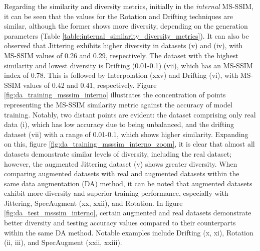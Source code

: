 \documentclass[journal]{IEEEtran}
\begin{document}
Regarding the similarity and diversity metrics, initially in the \textit{internal} MS-SSIM, it can be seen that the values for the Rotation and Drifting techniques are similar, although the former shows more diversity, depending on the generation parameters (Table \ref{table:internal_similarity_diversity_metrics}).
It can also be observed that Jittering exhibits higher diversity in datasets (v) and (iv), with MS-SSIM values of 0.26 and 0.29, respectively.
The dataset with the highest similarity and lowest diversity is Drifting (0.01-0.1) (vii), which has an MS-SSIM index of 0.78. This is followed by Interpolation (xxv) and Drifting (vi), with MS-SSIM values of 0.42 and 0.41, respectively.
Figure \ref{fig:da_training_msssim_interno} illustrates the concentration of points representing the MS-SSIM similarity metric against the accuracy of model training. Notably, two distant points are evident: the dataset comprising only real data (i), which has low accuracy due to being unbalanced, and the drifting dataset (vii) with a range of 0.01-0.1, which shows higher similarity. Expanding on this, figure \ref{fig:da_training_msssim_interno_zoom}, it is clear that almost all datasets demonstrate similar levels of diversity, including the real dataset; however, the augmented Jittering dataset (v) shows greater diversity.
When comparing augmented datasets with real and augmented datasets within the same data augmentation (DA) method, it can be noted that augmented datasets exhibit more diversity and superior training performance, especially with Jittering, SpecAugment (xx, xxii), and Rotation.
In figure \ref{fig:da_test_msssim_interno}, certain augmented and real datasets demonstrate better diversity and testing accuracy values compared to their counterparts within the same DA method. Notable examples include Drifting (x, xi), Rotation (ii, iii), and SpecAugment (xxii, xxiii).\\
\end{document}
